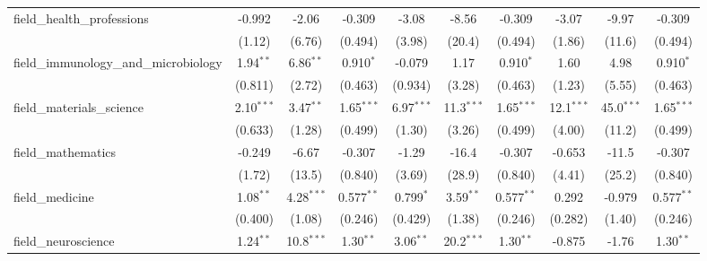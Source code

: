 \begin{tabular}{lccccccccc}
   field\_health\_professions                                  & -0.992        & -2.06         & -0.309        & -3.08         & -8.56          & -0.309        & -3.07         & -9.97         & -0.309\\   
                                                               & (1.12)        & (6.76)        & (0.494)       & (3.98)        & (20.4)         & (0.494)       & (1.86)        & (11.6)        & (0.494)\\   
   field\_immunology\_and\_microbiology                        & 1.94$^{**}$   & 6.86$^{**}$   & 0.910$^{*}$   & -0.079        & 1.17           & 0.910$^{*}$   & 1.60          & 4.98          & 0.910$^{*}$\\   
                                                               & (0.811)       & (2.72)        & (0.463)       & (0.934)       & (3.28)         & (0.463)       & (1.23)        & (5.55)        & (0.463)\\   
   field\_materials\_science                                   & 2.10$^{***}$  & 3.47$^{**}$   & 1.65$^{***}$  & 6.97$^{***}$  & 11.3$^{***}$   & 1.65$^{***}$  & 12.1$^{***}$  & 45.0$^{***}$  & 1.65$^{***}$\\   
                                                               & (0.633)       & (1.28)        & (0.499)       & (1.30)        & (3.26)         & (0.499)       & (4.00)        & (11.2)        & (0.499)\\   
   field\_mathematics                                          & -0.249        & -6.67         & -0.307        & -1.29         & -16.4          & -0.307        & -0.653        & -11.5         & -0.307\\   
                                                               & (1.72)        & (13.5)        & (0.840)       & (3.69)        & (28.9)         & (0.840)       & (4.41)        & (25.2)        & (0.840)\\   
   field\_medicine                                             & 1.08$^{**}$   & 4.28$^{***}$  & 0.577$^{**}$  & 0.799$^{*}$   & 3.59$^{**}$    & 0.577$^{**}$  & 0.292         & -0.979        & 0.577$^{**}$\\   
                                                               & (0.400)       & (1.08)        & (0.246)       & (0.429)       & (1.38)         & (0.246)       & (0.282)       & (1.40)        & (0.246)\\   
   field\_neuroscience                                         & 1.24$^{**}$   & 10.8$^{***}$  & 1.30$^{**}$   & 3.06$^{**}$   & 20.2$^{***}$   & 1.30$^{**}$   & -0.875        & -1.76         & 1.30$^{**}$\\   

\end{tabular}
